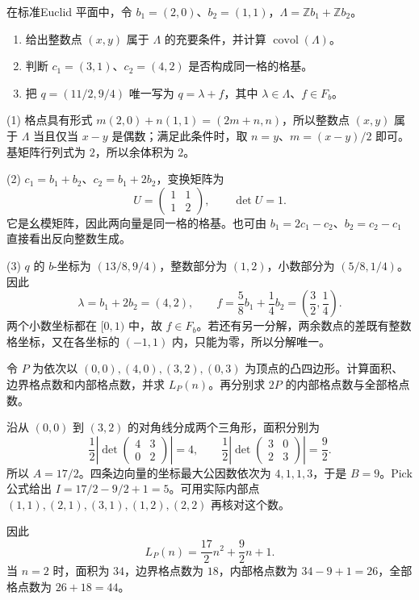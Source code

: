 \begin{exercise}
	\label{g1:ex:lattice-basis-cell}
	在标准Euclid 平面中，令 \(b_1=(2,0)\)、\(b_2=(1,1)\)，\(\Lambda=\mathbb Zb_1+\mathbb Zb_2\)。
	\begin{enumerate}
		\item 给出整数点 \((x,y)\) 属于 \(\Lambda\) 的充要条件，并计算 \(\operatorname{covol}(\Lambda)\)。
		\item 判断 \(c_1=(3,1)\)、\(c_2=(4,2)\) 是否构成同一格的格基。
		\item 把 \(q=(11/2,9/4)\) 唯一写为 \(q=\lambda+f\)，其中 \(\lambda\in\Lambda\)、\(f\in F_b\)。
	\end{enumerate}
\end{exercise}
\begin{solution}
	(1) 格点具有形式 \(m(2,0)+n(1,1)=(2m+n,n)\)，所以整数点 \((x,y)\) 属于 \(\Lambda\) 当且仅当 \(x-y\) 是偶数；满足此条件时，取 \(n=y\)、\(m=(x-y)/2\) 即可。基矩阵行列式为 \(2\)，所以余体积为 \(2\)。

	(2) \(c_1=b_1+b_2\)、\(c_2=b_1+2b_2\)，变换矩阵为
	\[
		U=\begin{pmatrix}1&1\\1&2\end{pmatrix},\qquad \det U=1.
	\]
	它是幺模矩阵，因此两向量是同一格的格基。也可由 \(b_1=2c_1-c_2\)、\(b_2=c_2-c_1\) 直接看出反向整数生成。

	(3) \(q\) 的 \(b\)-坐标为 \((13/8,9/4)\)，整数部分为 \((1,2)\)，小数部分为 \((5/8,1/4)\)。因此
	\[
		\lambda=b_1+2b_2=(4,2),\qquad
		f=\frac58b_1+\frac14b_2=\left(\frac32,\frac14\right).
	\]
	两个小数坐标都在 \([0,1)\) 中，故 \(f\in F_b\)。若还有另一分解，两余数点的差既有整数格坐标，又在各坐标的 \((-1,1)\) 内，只能为零，所以分解唯一。
\end{solution}

\begin{exercise}
	\label{g1:ex:pick-quadrilateral}
	令 \(P\) 为依次以 \((0,0),(4,0),(3,2),(0,3)\) 为顶点的凸四边形。计算面积、边界格点数和内部格点数，并求 \(L_P(n)\)。再分别求 \(2P\) 的内部格点数与全部格点数。
\end{exercise}
\begin{solution}
	沿从 \((0,0)\) 到 \((3,2)\) 的对角线分成两个三角形，面积分别为
	\[
		\frac12\left|\det\begin{pmatrix}4&3\\0&2\end{pmatrix}\right|=4,
		\qquad
		\frac12\left|\det\begin{pmatrix}3&0\\2&3\end{pmatrix}\right|=\frac92.
	\]
	所以 \(A=17/2\)。四条边向量的坐标最大公因数依次为 \(4,1,1,3\)，于是 \(B=9\)。Pick 公式给出 \(I=17/2-9/2+1=5\)。可用实际内部点 \((1,1),(2,1),(3,1),(1,2),(2,2)\) 再核对这个数。

	因此
	\[
		L_P(n)=\frac{17}{2}n^2+\frac92n+1.
	\]
	当 \(n=2\) 时，面积为 \(34\)，边界格点数为 \(18\)，内部格点数为 \(34-9+1=26\)，全部格点数为 \(26+18=44\)。
\end{solution}

